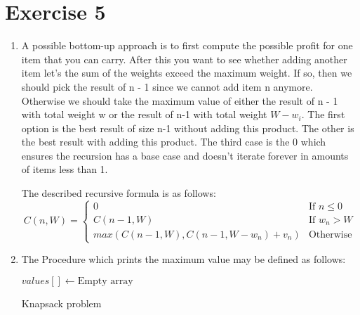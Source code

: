 \documentclass{article}
\begin{document}
\section*{Exercise 5}
\begin{enumerate}
  \item A possible bottom-up approach is to first compute the possible profit for one item that you can carry. After this you want to see whether adding another item let's the sum of the weights exceed the maximum weight. If so, then we should pick the result of n - 1 since we cannot add item n anymore. Otherwise we should take the maximum value of either the result of n - 1 with total weight w or the result of n-1 with total weight $W - w_i$. The first option is the best result of size n-1 without adding this product. The other is the best result with adding this product. The third case is the 0 which ensures the recursion has a base case and doesn't iterate forever in amounts of items less than 1.

  The described recursive formula is as follows:
  $$ C(n, W) =
  \begin{cases}
    0 &\mbox{If } n \leq 0 \\
    C(n-1, W) &\mbox{If } w_n > W \\
    max(C(n-1, W), C(n-1, W-w_n) + v_n) &\mbox{Otherwise}

  \end{cases}$$
  \item The Procedure which prints the maximum value may be defined as follows:

  \begin{algorithm}[h]
    \DontPrintSemicolon
    $values[] \leftarrow \text{Empty array}$ \;



      \caption{Knapsack problem}
  \end{algorithm}
\end{enumerate}
\end{document}

